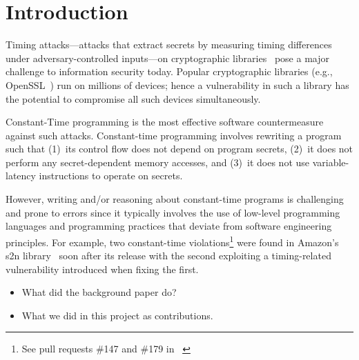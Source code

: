 \section{Introduction}

Timing attacks---attacks that extract secrets by measuring timing differences under adversary-controlled inputs---on cryptographic libraries~\cite{bernstein_cache_timing_attacks, dsa_exponentiations} pose a major challenge to information security today.
Popular cryptographic libraries (e.g., OpenSSL~\cite{openssl}) run on millions of devices; hence a vulnerability in such a library has the potential to compromise all such devices simultaneously.

Constant-Time programming is the most effective software countermeasure against such attacks.
Constant-time programming involves rewriting a program such that (1)~its control flow does not depend on program secrets, (2)~it does not perform any secret-dependent memory accesses, and (3)~it does not use variable-latency instructions to operate on secrets.

However, writing and/or reasoning about constant-time programs is challenging and prone to errors since it typically involves the use of low-level programming languages and programming practices that deviate from software engineering principles.
For example, two constant-time violations\footnote{See pull requests \#147 and \#179 in ~\cite{s2n}} were found in Amazon's s2n library~\cite{s2n} soon after its release with the second exploiting a timing-related vulnerability introduced when fixing the first.


\begin{itemize}
\item What did the background paper do?
\item What we did in this project as contributions. 
\end{itemize}
